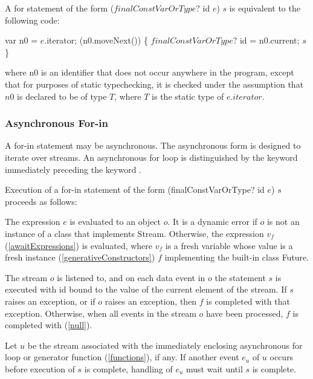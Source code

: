 \documentclass{article}
\newcommand{\code}[1]{{\sf #1}}
\begin{document}
\begin{itemize}
\LMHash{}
A for statement of the form \code{ \FOR{} ($finalConstVarOrType?$ id \IN{} $e$) $s$} is equivalent to the following code:

\begin{dartCode}
var n0 = $e$.iterator;
\WHILE{} (n0.moveNext()) \{
   $finalConstVarOrType?$ id = n0.current;
   $s$
\}
\end{dartCode}
where \code{n0} is an identifier that does not occur anywhere in the program, except that for purposes of static typechecking, it is checked under the assumption that $n0$ is declared to be of type $T$, where $T$ is the static type of $e.iterator$.



\subsubsection{Asynchronous For-in}

\LMHash{}
A for-in statement may be asynchronous. The asynchronous form is designed to iterate over streams. An asynchronous for loop is distinguished by the keyword \AWAIT{} immediately preceding the keyword \FOR.

\LMHash{}
Execution of a for-in statement of the form  \code{\AWAIT{} \FOR{} (finalConstVarOrType? id \IN{} $e$) $s$} proceeds as follows:

\LMHash{}
The expression $e$ is evaluated to an object $o$. It is a dynamic error if $o$ is not an instance of a class that implements \code{Stream}. Otherwise, the expression \code{\AWAIT{} $v_f$}  (\ref{awaitExpressions}) is evaluated, where $v_f$ is a fresh variable whose value is a fresh instance (\ref{generativeConstructors}) $f$ implementing the built-in class \code{Future}.

\LMHash{}
The stream $o$ is listened to,  and on each data event in $o$ the statement $s$ is executed with \code{id} bound to the value of the current element of the stream. If $s$ raises an exception, or if $o$ raises an exception, then $f$ is completed with that exception. Otherwise, when all events in the stream $o$ have been processed, $f$ is completed with \NULL{}  (\ref{null}).

\LMHash{}
Let $u$ be the stream associated with the immediately enclosing asynchronous for loop or generator function (\ref{functions}), if any. If another event $e_u$ of $u$ occurs before execution of $s$ is complete, handling of $e_u$ must wait until $s$ is complete.



\end{itemize}
\end{document}
